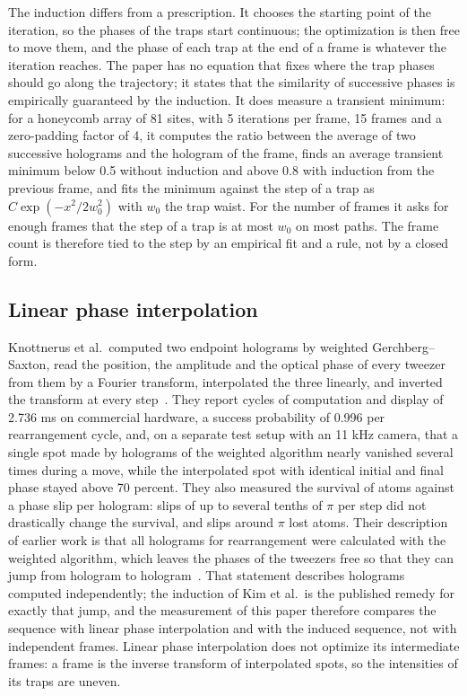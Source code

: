 The induction differs from a prescription. It chooses the starting point of the iteration, so the phases of the traps start continuous; the optimization is then free to move them, and the phase of each trap at the end of a frame is whatever the iteration reaches. The paper has no equation that fixes where the trap phases should go along the trajectory; it states that the similarity of successive phases is empirically guaranteed by the induction. It does measure a transient minimum: for a honeycomb array of 81 sites, with 5 iterations per frame, 15 frames and a zero-padding factor of 4, it computes the ratio between the average of two successive holograms and the hologram of the frame, finds an average transient minimum below 0.5 without induction and above 0.8 with induction from the previous frame, and fits the minimum against the step of a trap as $C\exp(-x^2/2w_0^2)$ with $w_0$ the trap waist. For the number of frames it asks for enough frames that the step of a trap is at most $w_0$ on most paths. The frame count is therefore tied to the step by an empirical fit and a rule, not by a closed form.

\subsection{Linear phase interpolation}

Knottnerus et al.\ computed two endpoint holograms by weighted Gerchberg--Saxton, read the position, the amplitude and the optical phase of every tweezer from them by a Fourier transform, interpolated the three linearly, and inverted the transform at every step~\cite{lpi}. They report cycles of computation and display of 2.736 ms on commercial hardware, a success probability of 0.996 per rearrangement cycle, and, on a separate test setup with an 11 kHz camera, that a single spot made by holograms of the weighted algorithm nearly vanished several times during a move, while the interpolated spot with identical initial and final phase stayed above 70 percent. They also measured the survival of atoms against a phase slip per hologram: slips of up to several tenths of $\pi$ per step did not drastically change the survival, and slips around $\pi$ lost atoms. Their description of earlier work is that all holograms for rearrangement were calculated with the weighted algorithm, which leaves the phases of the tweezers free so that they can jump from hologram to hologram~\cite{lpi}. That statement describes holograms computed independently; the induction of Kim et al.\ is the published remedy for exactly that jump, and the measurement of this paper therefore compares the sequence with linear phase interpolation and with the induced sequence, not with independent frames. Linear phase interpolation does not optimize its intermediate frames: a frame is the inverse transform of interpolated spots, so the intensities of its traps are uneven.

